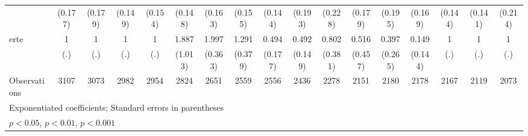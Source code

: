 {\begin{tabular}{l*{16}{c}}
                    &     (0.177)         &     (0.179)         &     (0.149)         &     (0.154)         &     (0.148)         &     (0.163)         &     (0.155)         &     (0.144)         &     (0.193)         &     (0.228)         &     (0.179)         &     (0.195)         &     (0.169)         &     (0.144)         &     (0.141)         &     (0.214)         \\
[1em]
erte                &           1         &           1         &           1         &           1         &       1.887         &       1.997\sym{***}&       1.291         &       0.494\sym{*}  &       0.492\sym{*}  &       0.802         &       0.516         &       0.397         &       0.149\sym{*}  &           1         &           1         &           1         \\
                    &         (.)         &         (.)         &         (.)         &         (.)         &     (1.013)         &     (0.363)         &     (0.379)         &     (0.177)         &     (0.149)         &     (0.381)         &     (0.457)         &     (0.265)         &     (0.144)         &         (.)         &         (.)         &         (.)         \\
\hline
Observations        &        3107         &        3073         &        2982         &        2954         &        2824         &        2651         &        2559         &        2556         &        2436         &        2278         &        2151         &        2180         &        2178         &        2167         &        2119         &        2073         \\
\hline\hline
\multicolumn{17}{l}{\footnotesize Exponentiated coefficients; Standard errors in parentheses}\\
\multicolumn{17}{l}{\footnotesize \sym{*} \(p<0.05\), \sym{**} \(p<0.01\), \sym{***} \(p<0.001\)}\\
\end{tabular}
}
